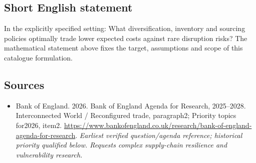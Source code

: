 \documentclass[11pt]{article}
\begin{document}
\subsection{Short English statement}
In the explicitly specified setting: What diversification, inventory and sourcing policies optimally trade lower expected costs against rare disruption risks? The mathematical statement above fixes the target, assumptions and scope of this catalogue formulation.

\subsection{Sources}
\begin{itemize}\raggedright
\item[\textnormal{[S1]}]\hypertarget{source:30007627:1}{} Bank of England. 2026. Bank of England Agenda for Research, 2025–2028. Interconnected World / Reconfigured trade, paragraph2; Priority topics for2026, item2.
\url{https://www.bankofengland.co.uk/research/bank-of-england-agenda-for-research}.
{\small\textit{Earliest verified question/agenda reference; historical priority qualified below. Requests complex supply-chain resilience and vulnerability research.}}
\end{itemize}
\end{document}
